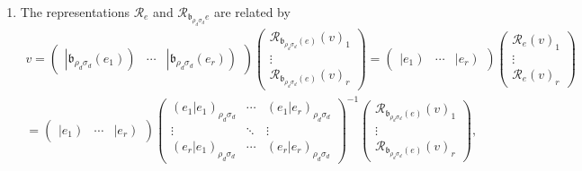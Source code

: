 \documentclass[aps,preprint]{revtex4}
\begin{document}
\begin{enumerate}
\item The representations $\mathcal{R}_{e}$ and $\mathcal{R}_{\mathfrak{b}%
_{\rho _{d}\sigma _{d}}e}$ are related by 
\begin{gather}
v=\left( 
\begin{array}{ccc}
\left\vert \mathfrak{b}_{\rho _{d}\sigma _{d}}\left( e_{1}\right) \right) & 
\cdots & \left\vert \mathfrak{b}_{\rho _{d}\sigma _{d}}\left( e_{r}\right)
\right)%
\end{array}%
\right) \left( 
\begin{array}{c}
\mathcal{R}_{\mathfrak{b}_{\rho _{d}\sigma _{d}}\left( e\right) }\left(
v\right) _{1} \\ 
\vdots \\ 
\mathcal{R}_{\mathfrak{b}_{\rho _{d}\sigma _{d}}\left( e\right) }\left(
v\right) _{r}%
\end{array}%
\right) =\left( 
\begin{array}{ccc}
\left\vert e_{1}\right) & \cdots & \left\vert e_{r}\right)%
\end{array}%
\right) \left( 
\begin{array}{c}
\mathcal{R}_{e}\left( v\right) _{1} \\ 
\vdots \\ 
\mathcal{R}_{e}\left( v\right) _{r}%
\end{array}%
\right) \\
=\left( 
\begin{array}{ccc}
\left\vert e_{1}\right) & \cdots & \left\vert e_{r}\right)%
\end{array}%
\right) \left( 
\begin{array}{ccc}
\left( \left. e_{1}\right\vert e_{1}\right) _{\rho _{d}\sigma _{d}} & \cdots
& \left( \left. e_{1}\right\vert e_{r}\right) _{\rho _{d}\sigma _{d}} \\ 
\vdots & \ddots & \vdots \\ 
\left( \left. e_{r}\right\vert e_{1}\right) _{\rho _{d}\sigma _{d}} & \cdots
& \left( \left. e_{r}\right\vert e_{r}\right) _{\rho _{d}\sigma _{d}}%
\end{array}%
\right) ^{\boldsymbol{-}1}\left( 
\begin{array}{c}
\mathcal{R}_{\mathfrak{b}_{\rho _{d}\sigma _{d}}\left( e\right) }\left(
v\right) _{1} \\ 
\vdots \\ 
\mathcal{R}_{\mathfrak{b}_{\rho _{d}\sigma _{d}}\left( e\right) }\left(
v\right) _{r}%
\end{array}%
\right) ,
\end{gather}%

\end{enumerate}
\end{document}
